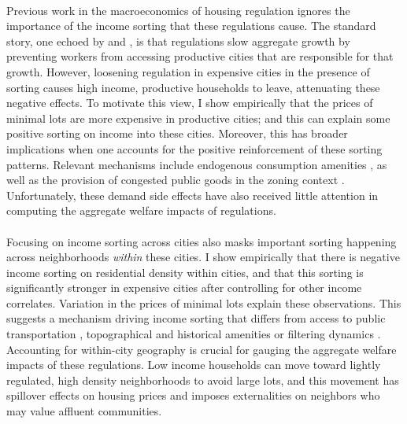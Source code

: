 \documentclass[]{article}
\begin{document}
	\paragraph*{}
	Previous work in the macroeconomics of housing regulation ignores the importance of the income sorting that these regulations cause. The standard story, one echoed by \cite{hseihmoretti} and \cite{durantonpugaurbgrowth}, is that regulations slow aggregate growth by preventing workers from accessing productive cities that are responsible for that growth. However, loosening regulation in expensive cities in the presence of sorting causes high income, productive households to leave, attenuating these negative effects. To motivate this view, I show empirically that the prices of minimal lots are more expensive in productive cities; and this can explain some positive sorting on income into these cities. Moreover, this has broader implications when one accounts for the positive reinforcement of these sorting patterns. Relevant mechanisms include endogenous consumption amenities \citep{diamond2016}, as well as the provision of congested public goods in the zoning context \citep{calabresetal, ineffTiebout}. Unfortunately, these demand side effects have also received little attention in computing the aggregate welfare impacts of regulations. 
	 
	
	\paragraph*{} 
	Focusing on income sorting across cities also masks important sorting happening across neighborhoods \textit{within} these cities. I show empirically that there is negative income sorting on residential density within cities, and that this sorting is significantly stronger in expensive cities after controlling for other income correlates. Variation in the prices of minimal lots explain these observations. This suggests a mechanism driving income sorting that differs from access to public transportation \citep{ccpoortransport}, topographical and historical amenities \citep{parispoor} or filtering dynamics \citep{Gentrificationcycles}. Accounting for within-city geography is crucial for gauging the aggregate welfare impacts of these regulations. Low income households can move toward lightly regulated, high density neighborhoods to avoid large lots, and this movement has spillover effects on housing prices and imposes externalities on neighbors who may value affluent communities. 
	
\end{document}
